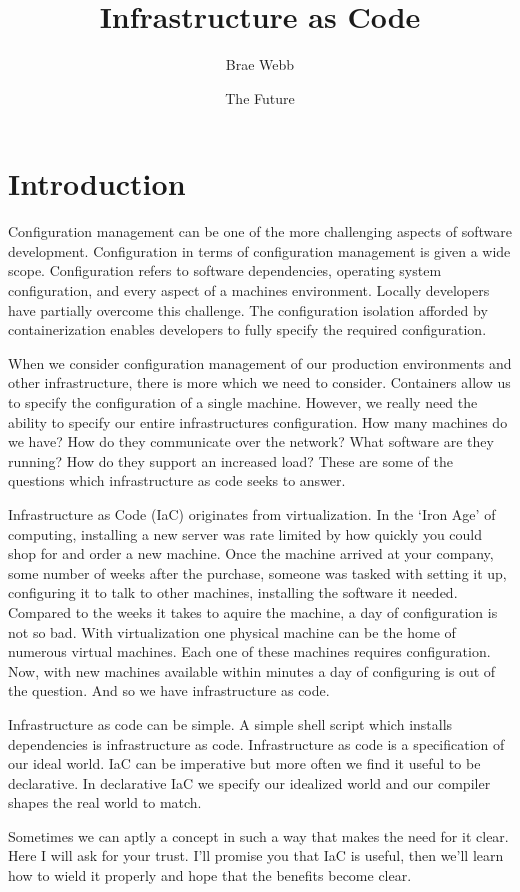 \documentclass{csse4400}
\title{Infrastructure as Code}
\author{Brae Webb}
\date{{\color{red} The Future}}
\begin{document}
\makecover

\maketitle

\section{Introduction}
Configuration management can be one of the more challenging aspects of software development.
Configuration in terms of configuration management is given a wide scope.
Configuration refers to software dependencies, operating system configuration, and every aspect of a machines environment.
Locally developers have partially overcome this challenge.
The configuration isolation afforded by containerization enables developers to fully specify the required configuration.

When we consider configuration management of our production environments and other infrastructure,
there is more which we need to consider.
Containers allow us to specify the configuration of a single machine.
However, we really need the ability to specify our entire infrastructures configuration.
How many machines do we have?
How do they communicate over the network?
What software are they running?
How do they support an increased load?
These are some of the questions which infrastructure as code seeks to answer.

Infrastructure as Code (IaC) originates from virtualization.
In the `Iron Age' of computing, installing a new server was rate limited by how quickly you could shop for and order a new machine.
Once the machine arrived at your company, some number of weeks after the purchase,
someone was tasked with setting it up, configuring it to talk to other machines, installing the software it needed.
Compared to the weeks it takes to aquire the machine, a day of configuration is not so bad.
With virtualization one physical machine can be the home of numerous virtual machines.
Each one of these machines requires configuration.
Now, with new machines available within minutes a day of configuring is out of the question.
And so we have infrastructure as code.

Infrastructure as code can be simple.
A simple shell script which installs dependencies is infrastructure as code.
Infrastructure as code is a specification of our ideal world.
IaC can be imperative but more often we find it useful to be declarative.
In declarative IaC we specify our idealized world and our compiler shapes the real world to match.

Sometimes we can aptly a concept in such a way that makes the need for it clear.
Here I will ask for your trust.
I'll promise you that IaC is useful,
then we'll learn how to wield it properly and hope that the benefits become clear.



\end{document}
